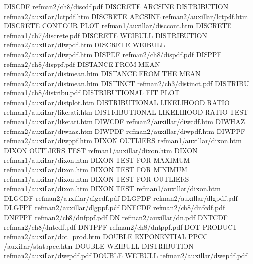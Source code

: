 DISCDF                                  refman2/ch8/discdf.pdf
DISCRETE ARCSINE DISTRIBUTION           refman2/auxillar/lctpdf.htm
DISCRETE ARCSINE                        refman2/auxillar/lctpdf.htm
DISCRETE CONTOUR PLOT                   refman1/auxillar/disccont.htm
DISCRETE                                refman1/ch7/discrete.pdf
DISCRETE WEIBULL DISTRIBUTION           refman2/auxillar/diwpdf.htm
DISCRETE WEIBULL                        refman2/auxillar/diwpdf.htm
DISPDF                                  refman2/ch8/dispdf.pdf
DISPPF                                  refman2/ch8/disppf.pdf
DISTANCE FROM MEAN                      refman2/auxillar/distmean.htm
DISTANCE FROM THE MEAN                  refman2/auxillar/distmean.htm
DISTINCT                                refman2/ch3/distinct.pdf
DISTRIBU                                refman1/ch8/distribu.pdf
DISTRIBUTIONAL FIT PLOT                 refman1/auxillar/distplot.htm
DISTRIBUTIONAL LIKELIHOOD RATIO         refman1/auxillar/likerati.htm
DISTRIBUTIONAL LIKELIHOOD RATIO TEST    refman1/auxillar/likerati.htm
DIWCDF                                  refman2/auxillar/diwcdf.htm
DIWHAZ                                  refman2/auxillar/diwhaz.htm
DIWPDF                                  refman2/auxillar/diwpdf.htm
DIWPPF                                  refman2/auxillar/diwppf.htm
DIXON OUTLIERS                          refman1/auxillar/dixon.htm
DIXON OUTLIERS TEST                     refman1/auxillar/dixon.htm
DIXON                                   refman1/auxillar/dixon.htm
DIXON TEST FOR MAXIMUM                  refman1/auxillar/dixon.htm
DIXON TEST FOR MINIMUM                  refman1/auxillar/dixon.htm
DIXON TEST FOR OUTLIERS                 refman1/auxillar/dixon.htm
DIXON TEST                              refman1/auxillar/dixon.htm
DLGCDF                                  refman2/auxillar/dlgcdf.pdf
DLGPDF                                  refman2/auxillar/dlgpdf.pdf
DLGPPF                                  refman2/auxillar/dlgppf.pdf
DNFCDF                                  refman2/ch8/dnfcdf.pdf
DNFPPF                                  refman2/ch8/dnfppf.pdf
DN                                      refman2/auxillar/dn.pdf
DNTCDF                                  refman2/ch8/dntcdf.pdf
DNTPPF                                  refman2/ch8/dntppf.pdf
DOT PRODUCT                             refman2/auxillar/dot_prod.htm
DOUBLE EXPONENTIAL PPCC                 /auxillar/statppcc.htm
DOUBLE WEIBULL DISTRIBUTION             refman2/auxillar/dwepdf.pdf
DOUBLE WEIBULL                          refman2/auxillar/dwepdf.pdf

